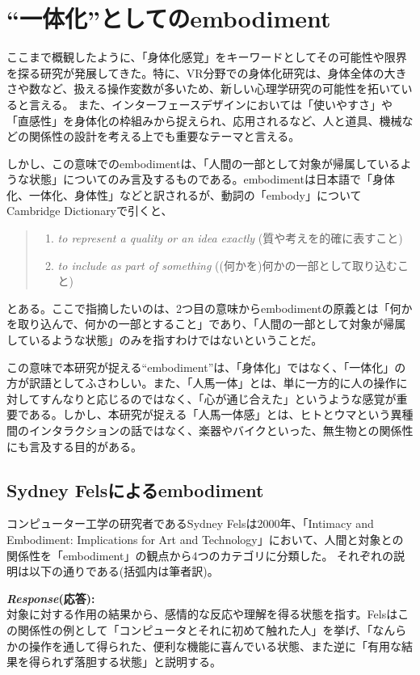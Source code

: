 \section{``一体化''としてのembodiment}
ここまで概観したように、「身体化感覚」をキーワードとしてその可能性や限界を探る研究が発展してきた。特に、VR分野での身体化研究は、身体全体の大きさや数など、扱える操作変数が多いため、新しい心理学研究の可能性を拓いていると言える。
また、インターフェースデザインにおいては「使いやすさ」や「直感性」を身体化の枠組みから捉えられ、応用されるなど、人と道具、機械などの関係性の設計を考える上でも重要なテーマと言える。

しかし、この意味でのembodimentは、「人間の一部として対象が帰属しているような状態」についてのみ言及するものである。embodimentは日本語で「身体化、一体化、身体性」などと訳されるが、動詞の「embody」についてCambridge Dictionaryで引くと、
\begin{quote}
  \begin{enumerate}
    \item \textit{to represent a quality or an idea exactly} (質や考えを的確に表すこと) 
    \item \textit{to include as part of something} ((何かを)何かの一部として取り込むこと)
  \end{enumerate}
\end{quote}
とある\cite{embody}。ここで指摘したいのは、2つ目の意味からembodimentの原義とは「何かを取り込んで、何かの一部とすること」であり、「人間の一部として対象が帰属しているような状態」のみを指すわけではないということだ。

この意味で本研究が捉える``embodiment''は、「身体化」ではなく、「一体化」の方が訳語としてふさわしい。また、「人馬一体」とは、単に一方的に人の操作に対してすんなりと応じるのではなく、「心が通じ合えた」というような感覚が重要である。しかし、本研究が捉える「人馬一体感」とは、ヒトとウマという異種間のインタラクションの話ではなく、楽器やバイクといった、無生物との関係性にも言及する目的がある。

\subsection{Sydney Felsによるembodiment}

コンピューター工学の研究者であるSydney Felsは2000年、「Intimacy and Embodiment: Implications for Art and Technology」\cite{Fels}において、人間と対象との関係性を「embodiment」の観点から4つのカテゴリに分類した。
それぞれの説明は以下の通りである(括弧内は筆者訳)。

\textbf{\textit{Response}(応答):}\\
対象に対する作用の結果から、感情的な反応や理解を得る状態を指す。Felsはこの関係性の例として「コンピュータとそれに初めて触れた人」を挙げ、「なんらかの操作を通して得られた、便利な機能に喜んでいる状態、また逆に「有用な結果を得られず落胆する状態」と説明する。


